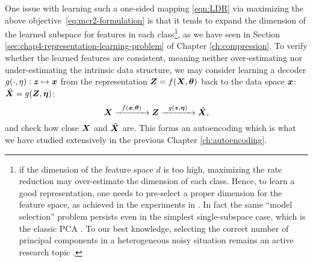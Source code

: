 \documentclass[\toplevelprefix/book-main.tex]{subfiles}
\begin{document}
{One issue with learning such a one-sided mapping \eqref{eqn:LDR} via  maximizing the above \mbox{objective \eqref{eq:mcr2-formulation}} is that it tends to expand the dimension of the learned subspace for features in each class\footnote{if the dimension of the feature space $d$ is too high, maximizing the rate reduction may over-estimate the dimension of each class. Hence, to learn a good representation, one needs to pre-select a proper dimension for the feature space, as achieved in the experiments in \cite{yu2020learning}. In fact the same ``model selection'' problem persists even in the simplest single-subspace case, which is the classic PCA \cite{Jolliffe1986}. To our best knowledge, selecting the correct number of principal components in a heterogeneous noisy situation remains an active research topic \cite{hong2020selecting}.}, as we have seen in Section \ref{sec:chap4-representation-learning-problem} of Chapter \ref{ch:compression}. To verify whether the learned features are consistent, meaning neither over-estimating nor under-estimating the intrinsic data structure, we may consider learning a decoder $g(\cdot,\eta): \bm{z} \mapsto  \bm{x}$ from the representation $\bm{Z} = f(\bm{X},\bm\theta)$ back to the data space $\bm{x}$: $\hat {\bm{X}} = g(\bm{Z}, \bm\eta)$:
\begin{equation}
    \bm{X} \xrightarrow{\hspace{2mm} f(\bm{x}, \bm\theta)\hspace{2mm}} \bm{Z} \xrightarrow{\hspace{2mm} g(\bm{z}, \bm \eta) \hspace{2mm}} \hat {\bm{X}}, 
    \label{eqn:autoencoding-ch6}
\end{equation}
and check how close $\bm{X}$ and $\hat {\bm{X}}$ are. This forms an autoencoding which is  what we have studied extensively in the previous Chapter \ref{ch:autoencoding}.

}
\end{document}
